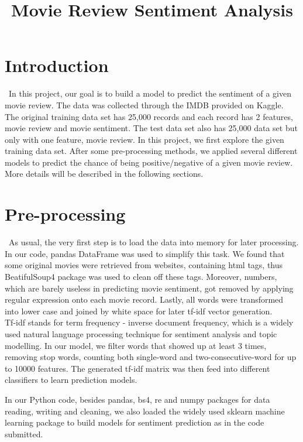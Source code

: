 \documentclass[12pt]{article}
\title{Movie Review Sentiment Analysis}
\begin{document}
%
\maketitle

\section{Introduction}
\quad\ In this project, our goal is to build a model to predict the sentiment of a given movie review. The data was collected through the IMDB provided on Kaggle. The original training data set has 25,000 records and each record has 2 features, movie review and movie sentiment. The test data set also has 25,000 data set but only with one feature, movie review. In this project, we first explore the given training data set. After some pre-processing methods, we applied several different models to predict the chance of being positive/negative of a given movie review. More details will be described in the following sections.

\section{Pre-processing}
\quad\ As usual, the very first step is to load the data into memory for later processing. In our code, pandas DataFrame was used to simplify this task. We found that some original movies were retrieved from websites, containing html tags, thus BeatifulSoup4 package was used to clean off these tags. Moreover, numbers, which are barely useless in predicting movie sentiment, got removed by applying regular expression onto each  movie record. Lastly, all words were transformed into lower case and joined by white space for later tf-idf vector generation.\\

Tf-idf stands for term frequency - inverse document frequency, which is a widely used natural language processing technique for sentiment analysis and topic modelling. In our model, we filter words that showed up at least 3 times, removing stop words, counting both single-word and two-consecutive-word for up to 10000 features. The generated tf-idf matrix was then feed into different classifiers to learn prediction models.

In our Python code, besides pandas, bs4, re and numpy packages for data reading, writing and cleaning, we also loaded the widely used sklearn machine learning package to build models for sentiment prediction as in the code submitted.
\end{document}
